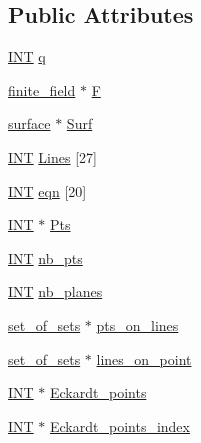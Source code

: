 \subsection*{Public Attributes}
\begin{DoxyCompactItemize}
\item 
\mbox{\hyperlink{galois_8h_a09fddde158a3a20bd2dcadb609de11dc}{I\+NT}} \mbox{\hyperlink{classsurface__object_a7a14a74403dd56a3ff5cf863aec676e3}{q}}
\item 
\mbox{\hyperlink{classfinite__field}{finite\+\_\+field}} $\ast$ \mbox{\hyperlink{classsurface__object_aa18a0d0dd0b756cc01a6056eb5b5a998}{F}}
\item 
\mbox{\hyperlink{classsurface}{surface}} $\ast$ \mbox{\hyperlink{classsurface__object_a23be3906bbf1ff7d8aab8a9b744595ba}{Surf}}
\item 
\mbox{\hyperlink{galois_8h_a09fddde158a3a20bd2dcadb609de11dc}{I\+NT}} \mbox{\hyperlink{classsurface__object_a0fae2a45446843f691e91d58fb905afe}{Lines}} \mbox{[}27\mbox{]}
\item 
\mbox{\hyperlink{galois_8h_a09fddde158a3a20bd2dcadb609de11dc}{I\+NT}} \mbox{\hyperlink{classsurface__object_a0fd2c77c27595731ee554e5b86a4b672}{eqn}} \mbox{[}20\mbox{]}
\item 
\mbox{\hyperlink{galois_8h_a09fddde158a3a20bd2dcadb609de11dc}{I\+NT}} $\ast$ \mbox{\hyperlink{classsurface__object_a02e013f97cf4f94ca5f530cc3130b2d3}{Pts}}
\item 
\mbox{\hyperlink{galois_8h_a09fddde158a3a20bd2dcadb609de11dc}{I\+NT}} \mbox{\hyperlink{classsurface__object_abbacd75913dba543f3c56e01dd55a7b6}{nb\+\_\+pts}}
\item 
\mbox{\hyperlink{galois_8h_a09fddde158a3a20bd2dcadb609de11dc}{I\+NT}} \mbox{\hyperlink{classsurface__object_aef238e7e7c79fa0b8d0f565a79f27edd}{nb\+\_\+planes}}
\item 
\mbox{\hyperlink{classset__of__sets}{set\+\_\+of\+\_\+sets}} $\ast$ \mbox{\hyperlink{classsurface__object_a3bd427a3ff539f8a74bf28cacd352187}{pts\+\_\+on\+\_\+lines}}
\item 
\mbox{\hyperlink{classset__of__sets}{set\+\_\+of\+\_\+sets}} $\ast$ \mbox{\hyperlink{classsurface__object_a5075e6de0d91435a7f63c2bfea3f9766}{lines\+\_\+on\+\_\+point}}
\item 
\mbox{\hyperlink{galois_8h_a09fddde158a3a20bd2dcadb609de11dc}{I\+NT}} $\ast$ \mbox{\hyperlink{classsurface__object_aec6c6124562954d320485fbdc20d2cf5}{Eckardt\+\_\+points}}
\item 
\mbox{\hyperlink{galois_8h_a09fddde158a3a20bd2dcadb609de11dc}{I\+NT}} $\ast$ \mbox{\hyperlink{classsurface__object_a0763705cdd9316e689a0fda66b38cf81}{Eckardt\+\_\+points\+\_\+index}}

\end{DoxyCompactItemize}
